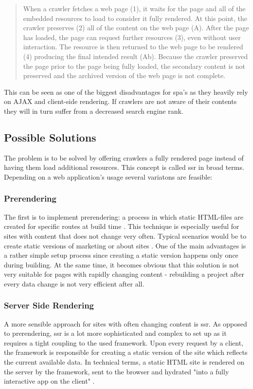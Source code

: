 \begin{quotation}
When a crawler fetches a web page (1), it waits for the page and all of the embedded resources to load to consider it fully rendered. At this point, the crawler preserves (2) all of the content on the web page (A). After the page has loaded, the page can request further resources (3), even without user interaction. The resource is then returned to the web page to be rendered (4) producing the final intended result (Ab). Because the crawler preserved the page prior to the page being fully loaded, the secondary content is not preserved and the archived version of the web page is not complete.
\end{quotation}

This can be seen as one of the biggest disadvantages for \acrshort{spa}'s as they heavily rely on AJAX and client-side rendering. If crawlers are not aware of their contents they will in turn suffer from a decreased search engine rank. 

\subsection{Possible Solutions} \label{sub:seo}
The problem is to be solved by offering crawlers a fully rendered page instead of having them load additional resources. This concept is called \acrfull{ssr} in broad terms. Depending on a web application's usage several variatons are feasible:

\subsubsection{Prerendering}
The first is to implement prerendering: a process in which static HTML-files are created for specific routes at build time \cite{VueSSR:online}. This technique is especially useful for sites with content that does not change very often. Typical scenarios would be to create static versions of marketing or about sites \cite{VueSSR:online}. One of the main advantages is a rather simple setup process since creating a static version happens only once during building. At the same time, it becomes obvious that this solution is not very suitable for pages with rapidly changing content - rebuilding a project after every data change is not very efficient after all.

\subsubsection{Server Side Rendering} \label{subsub:ssr}
A more sensible approach for sites with often changing content is \acrfull{ssr}. As opposed to prerendering, \acrshort{ssr} is a lot more sophisticated and complex to set up as it requires a tight coupling to the used framework. Upon every request by a client, the framework is responsible for creating a static version of the site which reflects the current available data. In technical terms, a static HTML site is rendered on the server by the framework, sent to the browser and hydrated "into a fully interactive app on the client" \cite{VueSSR:online}.

